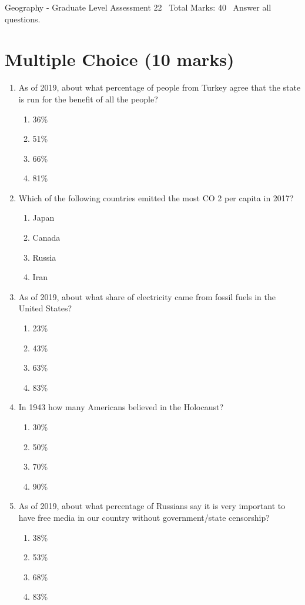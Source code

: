 \documentclass[12pt]{article}
\begin{document}
\begin{center}
Geography - Graduate Level Assessment 22 \
Total Marks: 40 \
Answer all questions.
\end{center}

\section*{Multiple Choice (10 marks)}
\begin{enumerate}[label=\arabic*.]
\item As of 2019, about what percentage of people from Turkey agree that the state is run for the benefit of all the people?
\begin{enumerate}[label=(\alph*)]
    \item 36\%
    \item 51\%
    \item 66\%
    \item 81\%
\end{enumerate}
\item Which of the following countries emitted the most CO 2 per capita in 2017?
\begin{enumerate}[label=(\alph*)]
    \item Japan
    \item Canada
    \item Russia
    \item Iran
\end{enumerate}
\item As of 2019, about what share of electricity came from fossil fuels in the United States?
\begin{enumerate}[label=(\alph*)]
    \item 23\%
    \item 43\%
    \item 63\%
    \item 83\%
\end{enumerate}
\item In 1943 how many Americans believed in the Holocaust?
\begin{enumerate}[label=(\alph*)]
    \item 30\%
    \item 50\%
    \item 70\%
    \item 90\%
\end{enumerate}
\item As of 2019, about what percentage of Russians say it is very important to have free media in our country without government/state censorship?
\begin{enumerate}[label=(\alph*)]
    \item 38\%
    \item 53\%
    \item 68\%
    \item 83\%
\end{enumerate}
\end{enumerate}
\end{document}
